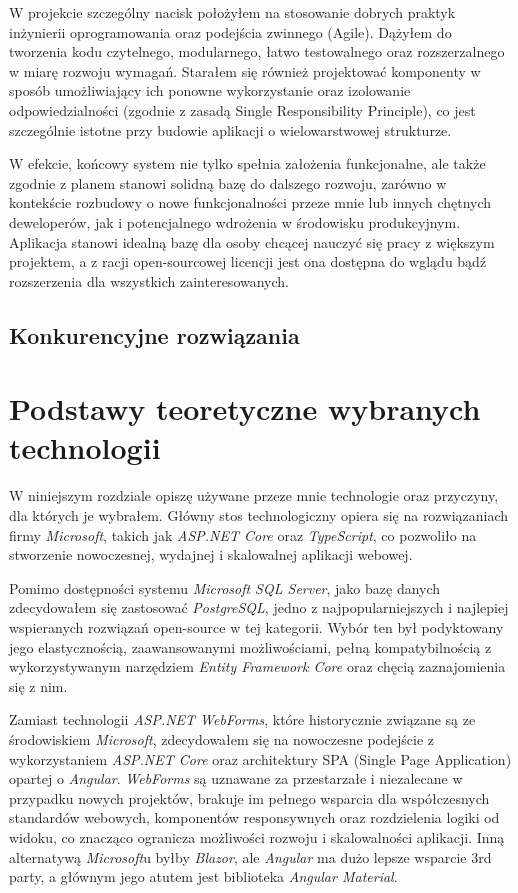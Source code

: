 \documentclass[a4paper,twoside,12pt]{book}
\begin{document}
W projekcie szczególny nacisk położyłem na stosowanie dobrych praktyk inżynierii oprogramowania oraz podejścia zwinnego (Agile). Dążyłem do tworzenia kodu czytelnego, modularnego, łatwo testowalnego oraz rozszerzalnego w miarę rozwoju wymagań. Starałem się również projektować komponenty w sposób umożliwiający ich ponowne wykorzystanie oraz izolowanie odpowiedzialności (zgodnie z zasadą Single Responsibility Principle), co jest szczególnie istotne przy budowie aplikacji o wielowarstwowej strukturze.

W efekcie, końcowy system nie tylko spełnia założenia funkcjonalne, ale także zgodnie z planem stanowi solidną bazę do dalszego rozwoju, zarówno w kontekście rozbudowy o nowe funkcjonalności przeze mnie lub innych chętnych deweloperów, jak i potencjalnego wdrożenia w środowisku produkcyjnym. Aplikacja stanowi idealną bazę dla osoby chcącej nauczyć się pracy z większym projektem, a z racji open-sourcowej licencji jest ona dostępna do wglądu bądź rozszerzenia dla wszystkich zainteresowanych.

\section{Konkurencyjne rozwiązania}

\chapter{Podstawy teoretyczne wybranych technologii}

W niniejszym rozdziale opiszę używane przeze mnie technologie oraz przyczyny, dla których je wybrałem. Główny stos technologiczny opiera się na rozwiązaniach firmy \textit{Microsoft}, takich jak \textit{ASP.NET Core} oraz \textit{TypeScript}, co pozwoliło na stworzenie nowoczesnej, wydajnej i skalowalnej aplikacji webowej. 

Pomimo dostępności systemu \textit{Microsoft SQL Server}, jako bazę danych zdecydowałem się zastosować \textit{PostgreSQL}, jedno z najpopularniejszych i najlepiej wspieranych rozwiązań open-source w tej kategorii. Wybór ten był podyktowany jego elastycznością, zaawansowanymi możliwościami, pełną kompatybilnością z wykorzystywanym narzędziem \textit{Entity Framework Core} oraz chęcią zaznajomienia się z nim. 

Zamiast technologii \textit{ASP.NET WebForms}, które historycznie związane są ze środowiskiem \textit{Microsoft}, zdecydowałem się na nowoczesne podejście z wykorzystaniem \textit{ASP.NET Core} oraz architektury SPA (Single Page Application) opartej o \textit{Angular}. \textit{WebForms} są uznawane za przestarzałe i niezalecane w przypadku nowych projektów, brakuje im pełnego wsparcia dla współczesnych standardów webowych, komponentów responsywnych oraz rozdzielenia logiki od widoku, co znacząco ogranicza możliwości rozwoju i skalowalności aplikacji. Inną alternatywą \textit{Microsoft}u byłby \textit{Blazor}, ale \textit{Angular} ma dużo lepsze wsparcie 3rd party, a głównym jego atutem jest biblioteka \textit{Angular Material}.
\end{document}
